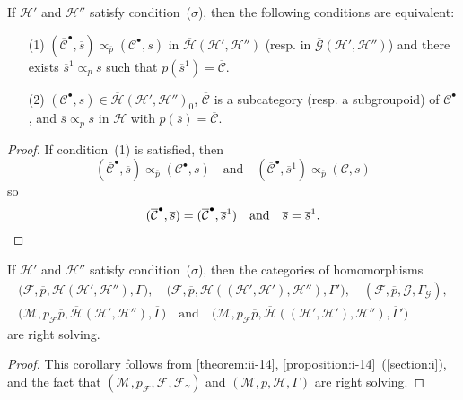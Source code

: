 \documentclass[a4paper,fleqn]{article}
\theoremstyle{plain}
\newenvironment{corollary}[1]
  {\renewcommand\theinnercorollary{#1}\innercorollary}
  {\endinnercorollary}
\theoremstyle{definition}
\newcommand{\oldpage}[1]{{\marginpar{\footnotesize$\bigg\vert$\,\,\,\,\textit{p.~#1}}}}
\newcommand{\textand}{\quad\text{and}\quad}
\newcommand{\CC}{\mathcal{C}}
\newcommand{\HH}{\mathcal{H}}
\newcommand{\MM}{\mathcal{M}}
\newcommand{\FF}{\mathcal{F}}
\newcommand{\subs}{\mathrel{\propto}}
\newcommand{\GG}{\mathcal{G}}
\newcommand{\smallbullet}{\bullet}
\begin{document}
\begin{corollary}{1}
  If $\HH'$ and $\HH''$ satisfy condition~($\sigma$), then the following conditions are equivalent:
  \begin{enumerate}
    \item[\normalfont(1)]
      $(\overline{\CC}^\smallbullet,\overline{s})\subs_{\overline{p}}(\CC^\smallbullet,s)$ in $\overline{\HH}(\HH',\HH'')$ (resp. in $\overline{\GG}(\HH',\HH'')$) and there exists $\overline{s}^1\subs_p s$ such that $p(\overline{s}^1)=\overline{\CC}$.

    \item[\normalfont(2)]
      $(\CC^\smallbullet,s)\in\overline{\HH}(\HH',\HH'')_0$, $\overline{\CC}$ is a subcategory (resp. a subgroupoid) of $\CC^\smallbullet$, and $\overline{s}\subs_p s$ in $\HH$ with $p(\overline{s})=\overline{\CC}$.
  \end{enumerate}
\end{corollary}

\begin{proof}
  \oldpage{417}
  If condition~(1) is satisfied, then
  \[
    (\overline{\CC}^\smallbullet,\overline{s})\subs_{\overline{p}}(\CC^\smallbullet,s)
    \textand
    (\overline{\CC}^\smallbullet,\overline{s}^1)\subs_{\overline{p}}(\CC,s)
  \]
  so
  \[
    (\overline{\CC}^\smallbullet,\overline{s})=(\overline{\CC}^\smallbullet,\overline{s}^1)
    \textand
    \overline{s}=\overline{s}^1.
    \qedhere
  \]
\end{proof}

\begin{corollary}{2}
  If $\HH'$ and $\HH''$ satisfy condition~($\sigma$), then the categories of homomorphisms
  \[
    \begin{gathered}
      \big(\FF,\overline{p},\overline{\HH}(\HH',\HH''),\overline{\Gamma}\big),
      \quad
      \big(\FF,\overline{p},\overline{\HH}((\HH',\HH'),\HH''),\overline{\Gamma}'\big),
      \quad
      (\FF,\overline{p},\overline{\GG},\overline{\Gamma}_\GG),
    \\\big(\MM,p_\FF\overline{p},\overline{\HH}(\HH',\HH''),\overline{\Gamma}\big)
      \textand
      \big(\MM,p_\FF\overline{p},\overline{\HH}((\HH',\HH'),\HH''),\overline{\Gamma}'\big)
    \end{gathered}
  \]
  are right solving.
\end{corollary}

\begin{proof}
  This corollary follows from \cref{theorem:ii-14}, \cref{proposition:i-14}~(\cref{section:i}), and the fact that $(\MM,p_\FF,\FF,\FF_\gamma)$ and $(\MM,p,\HH,\Gamma)$ are right solving.
\end{proof}
\end{document}
